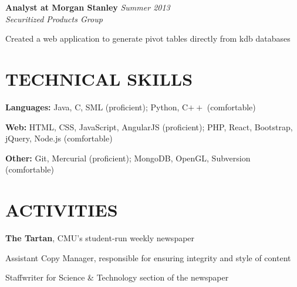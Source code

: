 \documentclass[margin, 11pt]{res} %
\begin{document}
\begin{resume}
\vspace{3pt}

{\bf Analyst at Morgan Stanley} \hfill {\sl Summer 2013} \\
{\sl Securitized Products Group}
\begin{itemize} \itemsep -2pt %
{\small
\item Created a web application to generate pivot tables directly from kdb databases
}
\end{itemize}


\section{TECHNICAL SKILLS}

{\bf Languages:}
Java, C, SML (proficient); Python, C$++$ (comfortable)

\vspace{5pt}

{\bf Web:}
HTML, CSS, JavaScript, AngularJS (proficient); PHP, React, Bootstrap, jQuery, Node.js (comfortable)

\vspace{5pt}

{\bf Other:}
Git, Mercurial (proficient); MongoDB, OpenGL, Subversion (comfortable)


\section{ACTIVITIES}

{\bf The Tartan}, CMU's student-run weekly newspaper

\begin{itemize} \itemsep -2pt
{\small \item Assistant Copy Manager, responsible for ensuring integrity and style of content
\item Staffwriter for Science \& Technology section of the newspaper}
\end{itemize}


\end{resume}
\end{document}
